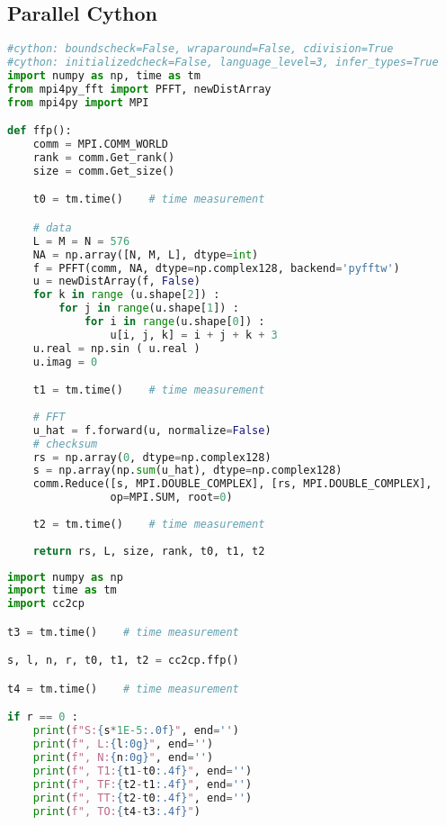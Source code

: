 \subsection{Parallel Cython}
\begin{lstlisting}[language=Python, caption={Parallel implementation of the FFT test case - Cython module.}]
#cython: boundscheck=False, wraparound=False, cdivision=True
#cython: initializedcheck=False, language_level=3, infer_types=True
import numpy as np, time as tm
from mpi4py_fft import PFFT, newDistArray
from mpi4py import MPI

def ffp():
    comm = MPI.COMM_WORLD
    rank = comm.Get_rank()
    size = comm.Get_size()

    t0 = tm.time()    # time measurement

    # data
    L = M = N = 576
    NA = np.array([N, M, L], dtype=int)
    f = PFFT(comm, NA, dtype=np.complex128, backend='pyfftw')
    u = newDistArray(f, False)
    for k in range (u.shape[2]) :
        for j in range(u.shape[1]) :
            for i in range(u.shape[0]) :
                u[i, j, k] = i + j + k + 3
    u.real = np.sin ( u.real )
    u.imag = 0

    t1 = tm.time()    # time measurement
    
    # FFT
    u_hat = f.forward(u, normalize=False)
    # checksum
    rs = np.array(0, dtype=np.complex128)
    s = np.array(np.sum(u_hat), dtype=np.complex128)
    comm.Reduce([s, MPI.DOUBLE_COMPLEX], [rs, MPI.DOUBLE_COMPLEX],
                op=MPI.SUM, root=0)
    
    t2 = tm.time()    # time measurement
    
    return rs, L, size, rank, t0, t1, t2
\end{lstlisting}




\begin{lstlisting}[language=Python, caption={Parallel implementation of the FFT test case - Python main code.}]
import numpy as np
import time as tm
import cc2cp

t3 = tm.time()    # time measurement

s, l, n, r, t0, t1, t2 = cc2cp.ffp()

t4 = tm.time()    # time measurement

if r == 0 :
    print(f"S:{s*1E-5:.0f}", end='')
    print(f", L:{l:0g}", end='')
    print(f", N:{n:0g}", end='')
    print(f", T1:{t1-t0:.4f}", end='')
    print(f", TF:{t2-t1:.4f}", end='')
    print(f", TT:{t2-t0:.4f}", end='')
    print(f", TO:{t4-t3:.4f}")
\end{lstlisting}




